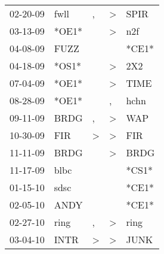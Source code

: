 \begin{supertabular}{p{0.07\textwidth}p{0.06\textwidth}p{0.02\textwidth}p{0.02\textwidth}p{0.06\textwidth}}
          02-20-09\textsuperscript{} &           fwll\textsuperscript{} &                , &     \textgreater &           SPIR\textsuperscript{} \\
          03-13-09\textsuperscript{} &                            *OE1* &                  &     \textgreater &            n2f\textsuperscript{} \\
          04-08-09\textsuperscript{} &           FUZZ\textsuperscript{} &                  &                  &                            *CE1* \\
          04-18-09\textsuperscript{} &                            *OS1* &                  &     \textgreater &            2X2\textsuperscript{} \\
          07-04-09\textsuperscript{} &                            *OE1* &                  &     \textgreater &           TIME\textsuperscript{} \\
          08-28-09\textsuperscript{} &                            *OE1* &                  &                , &           hchn\textsuperscript{} \\
          09-11-09\textsuperscript{} &           BRDG\textsuperscript{} &                , &     \textgreater &            WAP\textsuperscript{} \\
          10-30-09\textsuperscript{} &            FIR\textsuperscript{} &     \textgreater &     \textgreater &            FIR\textsuperscript{} \\
          11-11-09\textsuperscript{} &           BRDG\textsuperscript{} &                  &     \textgreater &           BRDG\textsuperscript{} \\
          11-17-09\textsuperscript{} &           blbc\textsuperscript{} &                  &                  &                            *CS1* \\
          01-15-10\textsuperscript{} &           sdsc\textsuperscript{} &                  &                  &                            *CE1* \\
          02-05-10\textsuperscript{} &           ANDY\textsuperscript{} &                  &                  &                            *CE1* \\
          02-27-10\textsuperscript{} &           ring\textsuperscript{} &                , &     \textgreater &           ring\textsuperscript{} \\
          03-04-10\textsuperscript{} &           INTR\textsuperscript{} &     \textgreater &     \textgreater &           JUNK\textsuperscript{} \\

\end{supertabular}
